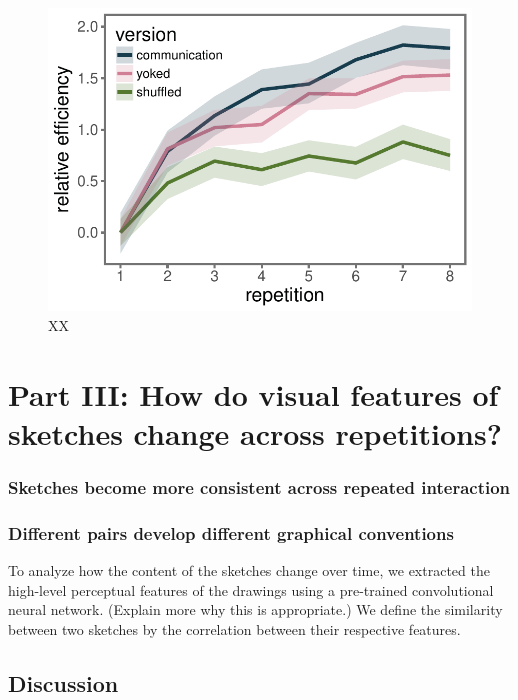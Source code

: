 \documentclass[10pt,letterpaper]{article}
\begin{document}
\begin{figure}
\includegraphics[width=\linewidth]{figures/recog_BIS_timeseries.pdf}
\caption{XX} \label{recog_bis}
\end{figure}

\section{Part III: How do visual features of sketches change across repetitions?}

\subsubsection{Sketches become more consistent across repeated interaction}


\subsubsection{Different pairs develop different graphical conventions} 
To analyze how the content of the sketches change over time, we extracted the high-level perceptual features of the drawings using a pre-trained convolutional neural network. 
(Explain more why this is appropriate.) 
We define the similarity between two sketches by the correlation between their respective features.


\subsection{Discussion}
\end{document}
